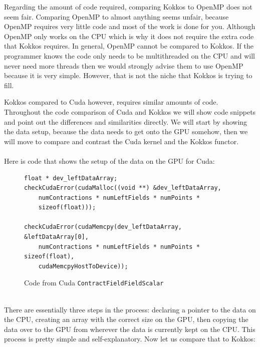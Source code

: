 Regarding the amount of code required, comparing Kokkos to OpenMP does not seem
fair. Comparing OpenMP to almost anything seems unfair, because OpenMP requires
very little code and most of the work is done for you. Although OpenMP only
works on the CPU which is why it does not require the extra code that Kokkos
requires. In general, OpenMP cannot be compared to Kokkos. If the programmer
knows the code only needs to be multithreaded on the CPU and will never need
more threads then we would strongly advise them to use OpenMP because it is very
simple. However, that is not the niche that Kokkos is trying to fill. 

Kokkos compared to Cuda however, requires similar amounts of code. 
Throughout the code comparison of Cuda and Kokkos we will show
code snippets and point out the differences and similarities directly. We will
start by showing the data setup, because the data needs to get onto the GPU
somehow, then we will move to compare and contrast the Cuda kernel and the Kokkos
functor. \\
\\
Here is code that shows the setup of the data on the GPU for Cuda: \\
\begin{figure}[!htb]
	\begin{lstlisting}
float * dev_leftDataArray;
checkCudaError(cudaMalloc((void **) &dev_leftDataArray, 
	numContractions * numLeftFields * numPoints * 
	sizeof(float)));
	
checkCudaError(cudaMemcpy(dev_leftDataArray, &leftDataArray[0], 
	numContractions * numLeftFields * numPoints * sizeof(float), 
	cudaMemcpyHostToDevice));
	\end{lstlisting}
\caption{Code from Cuda \texttt{ContractFieldFieldScalar}
\label{lst:ContractFieldFieldScalar Cuda Data Setup}}
\end{figure}
\\
There are essentially three steps in the process: declaring a pointer to the
data on the CPU, creating an array with the correct size on the GPU, then
copying the data over to the GPU from wherever the data is currently kept on the
CPU. This process is pretty simple and self-explanatory. Now let us compare that
to Kokkos: \\
